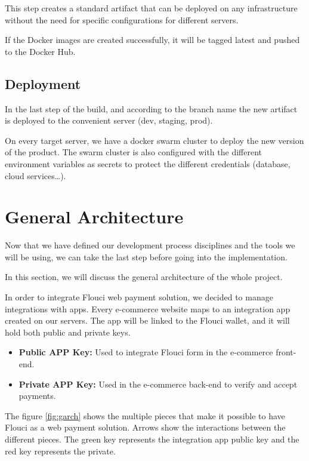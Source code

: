 \begin{spacing}{1.2}
This step creates a standard artifact that can be deployed on any infrastructure without the need for specific configurations for different servers.

If the Docker images are created successfully, it will be tagged latest and pushed to the Docker Hub.

\subsection{Deployment}
In the last step of the build, and according to the branch name the new artifact is deployed to the convenient server (dev, staging, prod).

On every target server, we have a docker swarm cluster to deploy the new version of the product.
The swarm cluster is also configured with the different environment variables as secrets to protect the different credentials (database, cloud services\dots).

\section{General Architecture}
Now that we have defined our development process disciplines and the tools we will be using, we can take the last step before going into the implementation.

In this section, we will discuss the general architecture of the whole project.

In order to integrate Flouci web payment solution, we decided to manage integrations with apps. Every e-commerce website maps to an integration app created on our servers. The app will be linked to the Flouci wallet, and it will hold both public and private keys.
\begin{itemize}
	\item \textbf{Public APP Key:} Used to integrate Flouci form in the e-commerce front-end.
	\item \textbf{Private APP Key:} Used in the e-commerce back-end to verify and accept payments.
\end{itemize}
 The figure \ref{fig:garch} shows the multiple pieces that make it possible to have Flouci as a web payment solution. Arrows show  the interactions between the different pieces. The green key represents the integration app public key and the red key represents the private.


\end{spacing}
